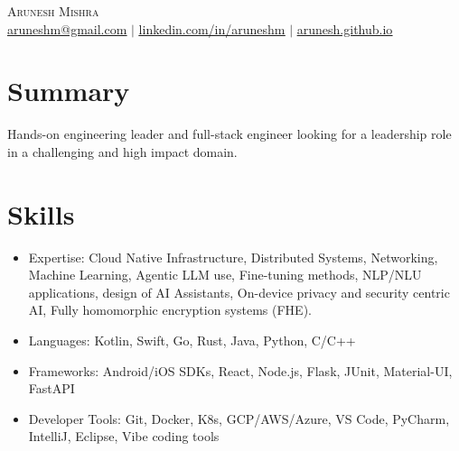 \documentclass[letterpaper,10pt]{article}
\newcommand{\resumeItem}[1]{
  \item\small{
    {#1 \vspace{-2pt}}
  }
}
\begin{document}

\begin{center}
    {\LARGE \scshape Arunesh \hspace{3mm} Mishra} \\ \vspace{1pt}
    \footnotesize{\href{mailto:aruneshm@gmail.com}{\underline{aruneshm@gmail.com}} $|$ 
    \href{https://linkedin.com/in/...}{\underline{linkedin.com/in/aruneshm}} $|$
    \href{https://arunesh.github.io}{\underline{arunesh.github.io}}}
\end{center}



\section{Summary}
Hands-on engineering leader and full-stack engineer looking for a leadership role in a challenging and high impact domain.

\section{Skills}
\begin{itemize}[leftmargin=3.5em, itemsep=0pt, label=\tiny$\bullet$]
  \resumeItem {Expertise: Cloud Native Infrastructure, Distributed Systems, Networking, Machine Learning, Agentic LLM use, Fine-tuning methods, NLP/NLU applications, design of AI Assistants, On-device privacy and security centric AI, Fully homomorphic encryption systems (FHE).}
  \resumeItem {Languages: Kotlin, Swift, Go, Rust, Java, Python, C/C++} 
  \resumeItem {Frameworks: Android/iOS SDKs, React, Node.js, Flask, JUnit, Material-UI, FastAPI}
  \resumeItem {Developer Tools: Git, Docker, K8s, GCP/AWS/Azure, VS Code, PyCharm, IntelliJ, Eclipse, Vibe coding tools}
\end{itemize}
\end{document}
